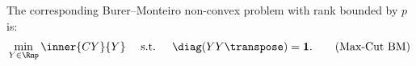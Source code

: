 \documentclass{article}
\newcommand{\1}{\mathbf{1}}
\begin{document}

The corresponding Burer--Monteiro non-convex problem with rank bounded by $p$ is:
\begin{align}
	\min_{Y\in\Rnp} \inner{CY}{Y} \quad \textrm{ s.t. } \quad  \diag(YY\transpose) = \1.
	\tag{Max-Cut BM}
	\label{eq:maxcutBM}
\end{align}
\end{document}
